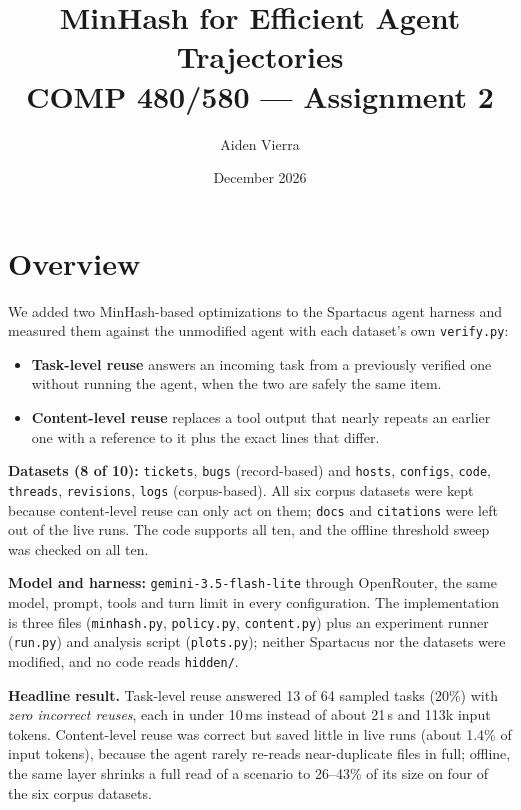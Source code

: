 \documentclass[11pt]{article}
\title{MinHash for Efficient Agent Trajectories\\[0.3em]
\large COMP 480/580 --- Assignment 2}
\author{Aiden Vierra}
\date{December 2026}
\begin{document}
\maketitle
\vspace{-2.5em}

\section{Overview}

We added two MinHash-based optimizations to the Spartacus agent harness and measured them
against the unmodified agent with each dataset's own \texttt{verify.py}:

\begin{itemize}
  \item \textbf{Task-level reuse} answers an incoming task from a previously verified one
        without running the agent, when the two are safely the same item.
  \item \textbf{Content-level reuse} replaces a tool output that nearly repeats an earlier
        one with a reference to it plus the exact lines that differ.
\end{itemize}

\textbf{Datasets (8 of 10):} \texttt{tickets}, \texttt{bugs} (record-based) and
\texttt{hosts}, \texttt{configs}, \texttt{code}, \texttt{threads}, \texttt{revisions},
\texttt{logs} (corpus-based). All six corpus datasets were kept because content-level reuse
can only act on them; \texttt{docs} and \texttt{citations} were left out of the live runs.
The code supports all ten, and the offline threshold sweep was checked on all ten.

\textbf{Model and harness:} \texttt{gemini-3.5-flash-lite} through OpenRouter, the same
model, prompt, tools and turn limit in every configuration. The implementation is three
files (\texttt{minhash.py}, \texttt{policy.py}, \texttt{content.py}) plus an experiment
runner (\texttt{run.py}) and analysis script (\texttt{plots.py}); neither Spartacus nor the
datasets were modified, and no code reads \texttt{hidden/}.

\textbf{Headline result.} Task-level reuse answered 13 of 64 sampled tasks (20\%) with
\emph{zero incorrect reuses}, each in under 10\,ms instead of about 21\,s and 113k input
tokens. Content-level reuse was correct but saved little in live runs (about 1.4\% of input
tokens), because the agent rarely re-reads near-duplicate files in full; offline, the same
layer shrinks a full read of a scenario to 26--43\% of its size on four of the six corpus
datasets.
\end{document}

